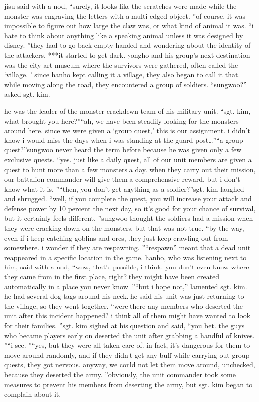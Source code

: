 jisu said with a nod, “surely, it looks like the scratches were made while the monster was engraving the letters with a multi-edged object.
”of course, it was impossible to figure out how large the claw was, or what kind of animal it was.
“i hate to think about anything like a speaking animal unless it was designed by disney.
”they had to go back empty-handed and wondering about the identity of the attackers.
***it started to get dark.
yongho and his group’s next destination was the city art museum where the survivors were gathered, often called the ‘village.
’ since hanho kept calling it a village, they also began to call it that.
while moving along the road, they encountered a group of soldiers.
“sungwoo?” asked sgt.
 kim.


he was the leader of the monster crackdown team of his military unit.
“sgt.
 kim, what brought you here?”“ah, we have been steadily looking for the monsters around here.
 since we were given a ‘group quest,’ this is our assignment.
 i didn’t know i would miss the days when i was standing at the guard post…”“a group quest?”sungwoo never heard the term before because he was given only a few exclusive quests.
“yes.
 just like a daily quest, all of our unit members are given a quest to hunt more than a few monsters a day.
 when they carry out their mission, our battalion commander will give them a comprehensive reward, but i don’t know what it is.
”“then, you don’t get anything as a soldier?”sgt.
 kim laughed and shrugged.
“well, if you complete the quest, you will increase your attack and defense power by 10 percent the next day, so it’s good for your chance of survival, but it certainly feels different.
”sungwoo thought the soldiers had a mission when they were cracking down on the monsters, but that was not true.
“by the way, even if i keep catching goblins and orcs, they just keep crawling out from somewhere.
 i wonder if they are respawning.
”“respawn” meant that a dead unit reappeared in a specific location in the game.
hanho, who was listening next to him, said with a nod, “wow, that’s possible, i think.
 you don’t even know where they came from in the first place, right? they might have been created automatically in a place you never know.
”“but i hope not,” lamented sgt.
 kim.
he had several dog tags around his neck.
 he said his unit was just returning to the village, so they went together.
“were there any members who deserted the unit after this incident happened? i think all of them might have wanted to look for their families.
”sgt.
 kim sighed at his question and said, “you bet.
 the guys who became players early on deserted the unit after grabbing a handful of knives.
”“i see.
”“yes, but they were all taken care of.
 in fact, it’s dangerous for them to move around randomly, and if they didn’t get any buff while carrying out group quests, they got nervous.
 anyway, we could not let them move around, unchecked, because they deserted the army.
”obviously, the unit commander took some measures to prevent his members from deserting the army, but sgt.
 kim began to complain about it.


 
